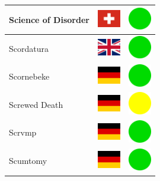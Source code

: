 \documentclass[12pt, a4paper, twoside]{report}
\begin{document}
\begin{center}
\begin{longtable}{|p{5cm}|p{2cm}|p{2cm}|}
 Science of Disorder                                        & \includegraphics[width=1cm]{../img/flags/ch} &   \includegraphics[width=1cm]{../likes/y} \\ \hline
 Scordatura                                                 & \includegraphics[width=1cm]{../img/flags/gb} &   \includegraphics[width=1cm]{../likes/y} \\ \hline
 Scornebeke                                                 & \includegraphics[width=1cm]{../img/flags/de} &   \includegraphics[width=1cm]{../likes/y} \\ \hline
 Screwed Death                                              & \includegraphics[width=1cm]{../img/flags/de} &   \includegraphics[width=1cm]{../likes/m} \\ \hline
 Scrvmp                                                     & \includegraphics[width=1cm]{../img/flags/de} &   \includegraphics[width=1cm]{../likes/y} \\ \hline
 Scumtomy                                                   & \includegraphics[width=1cm]{../img/flags/de} &   \includegraphics[width=1cm]{../likes/y} \\ \hline

\end{longtable}
\end{center}
\end{document}
